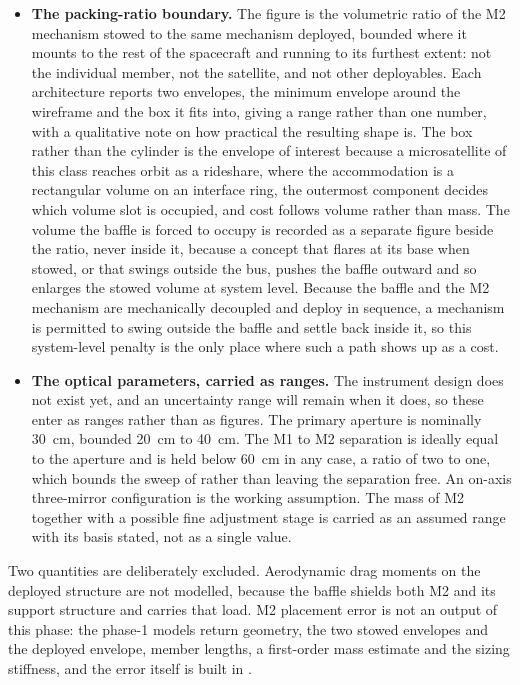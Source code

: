 \begin{itemize}
    \item \textbf{The packing-ratio boundary.} The figure is the volumetric ratio of the M2 mechanism stowed to the same mechanism deployed, bounded where it mounts to the rest of the spacecraft and running to its furthest extent: not the individual member, not the satellite, and not other deployables. Each architecture reports two envelopes, the minimum envelope around the wireframe and the box it fits into, giving a range rather than one number, with a qualitative note on how practical the resulting shape is. The box rather than the cylinder is the envelope of interest because a microsatellite of this class reaches orbit as a rideshare, where the accommodation is a rectangular volume on an interface ring, the outermost component decides which volume slot is occupied, and cost follows volume rather than mass. The volume the baffle is forced to occupy is recorded as a separate figure beside the ratio, never inside it, because a concept that flares at its base when stowed, or that swings outside the bus, pushes the baffle outward and so enlarges the stowed volume at system level. Because the baffle and the M2 mechanism are mechanically decoupled and deploy in sequence, a mechanism is permitted to swing outside the baffle and settle back inside it, so this system-level penalty is the only place where such a path shows up as a cost.

    \item \textbf{The optical parameters, carried as ranges.} The instrument design does not exist yet, and an uncertainty range will remain when it does, so these enter as ranges rather than as figures. The primary aperture is nominally \SI{30}{\centi\meter}, bounded \SI{20}{\centi\meter} to \SI{40}{\centi\meter}. The M1 to M2 separation is ideally equal to the aperture and is held below \SI{60}{\centi\meter} in any case, a ratio of two to one, which bounds the sweep of  rather than leaving the separation free. An on-axis three-mirror configuration is the working assumption. The mass of M2 together with a possible fine adjustment stage is carried as an assumed range with its basis stated, not as a single value.
\end{itemize}

Two quantities are deliberately excluded. Aerodynamic drag moments on the deployed structure are not modelled, because the baffle shields both M2 and its support structure and carries that load. M2 placement error is not an output of this phase: the phase-1 models return geometry, the two stowed envelopes and the deployed envelope, member lengths, a first-order mass estimate and the sizing stiffness, and the error itself is built in .


